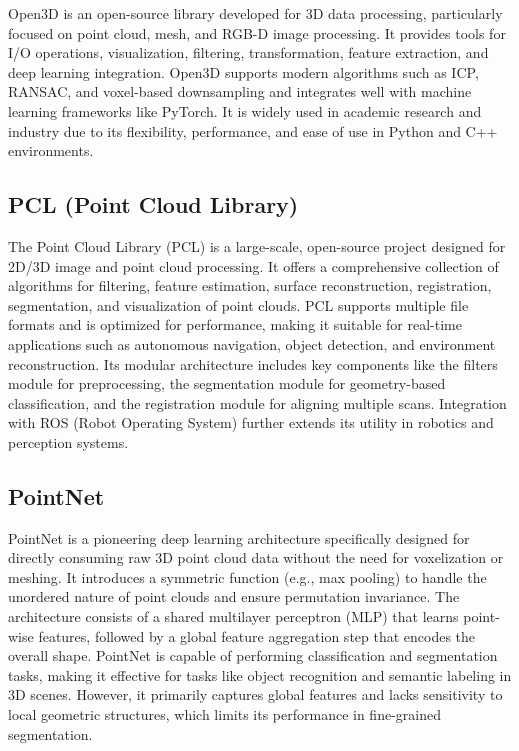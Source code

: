 \documentclass[../report.tex]{subfiles}
\begin{document}
    Open3D is an open-source library developed for 3D data processing, particularly focused on point cloud, mesh, and RGB-D image processing. It provides tools for I/O operations, visualization, filtering, transformation, feature extraction, and deep learning integration. Open3D supports modern algorithms such as ICP, RANSAC, and voxel-based downsampling and integrates well with machine learning frameworks like PyTorch. It is widely used in academic research and industry due to its flexibility, performance, and ease of use in Python and C++ environments.\cite{Open3D_Library}
    
    \subsection{PCL (Point Cloud Library)}
    
    The Point Cloud Library (PCL) is a large-scale, open-source project designed for 2D/3D image and point cloud processing\cite{PCL}. It offers a comprehensive collection of algorithms for filtering, feature estimation, surface reconstruction, registration, segmentation, and visualization of point clouds. PCL supports multiple file formats and is optimized for performance, making it suitable for real-time applications such as autonomous navigation, object detection, and environment reconstruction. Its modular architecture includes key components like the filters module for preprocessing, the segmentation module for geometry-based classification, and the registration module for aligning multiple scans. Integration with ROS (Robot Operating System) further extends its utility in robotics and perception systems.\cite{PCL}
    
    \subsection{PointNet}
    
    PointNet\cite{PointNet} is a pioneering deep learning architecture specifically designed for directly consuming raw 3D point cloud data without the need for voxelization or meshing. It introduces a symmetric function (e.g., max pooling) to handle the unordered nature of point clouds and ensure permutation invariance. The architecture consists of a shared multilayer perceptron (MLP) that learns point-wise features, followed by a global feature aggregation step that encodes the overall shape. PointNet is capable of performing classification and segmentation tasks, making it effective for tasks like object recognition and semantic labeling in 3D scenes. However, it primarily captures global features and lacks sensitivity to local geometric structures, which limits its performance in fine-grained segmentation.
    
\end{document}
